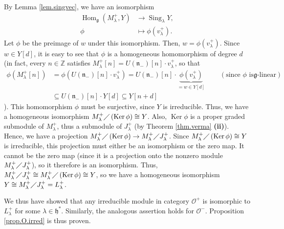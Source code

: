 \documentclass[etingof-lie.tex]{subfiles}
\begin{document}
By Lemma \ref{lem.singvec}, we have an isomorphism%
\begin{align*}
\operatorname*{Hom}\nolimits_{\mathfrak{g}}\left(  M_{\lambda}^{+},Y\right)
&  \rightarrow\operatorname*{Sing}\nolimits_{\lambda}Y,\\
\phi &  \mapsto\phi\left(  v_{\lambda}^{+}\right)  .
\end{align*}
Let $\phi$ be the preimage of $w$ under this isomorphism. Then, $w=\phi\left(
v_{\lambda}^{+}\right)  $. Since $w\in Y\left[  d\right]  $, it is easy to see
that $\phi$ is a homogeneous homomorphism of degree $d$ (in fact, every
$n\in\mathbb{Z}$ satisfies $M_{\lambda}^{+}\left[  n\right]  =U\left(
\mathfrak{n}_{-}\right)  \left[  n\right]  \cdot v_{\lambda}^{+}$, so that%
\begin{align*}
\phi\left(  M_{\lambda}^{+}\left[  n\right]  \right)   &  =\phi\left(
U\left(  \mathfrak{n}_{-}\right)  \left[  n\right]  \cdot v_{\lambda}%
^{+}\right)  =U\left(  \mathfrak{n}_{-}\right)  \left[  n\right]
\cdot\underbrace{\phi\left(  v_{\lambda}^{+}\right)  }_{=w\in Y\left[
d\right]  }\ \ \ \ \ \ \ \ \ \ \left(  \text{since }\phi\text{ is
}\mathfrak{g}\text{-linear}\right) \\
&  \subseteq U\left(  \mathfrak{n}_{-}\right)  \left[  n\right]  \cdot
Y\left[  d\right]  \subseteq Y\left[  n+d\right]
\end{align*}
). This homomorphism $\phi$ must be surjective, since $Y$ is irreducible.
Thus, we have a homogeneous isomorphism $M_{\lambda}^{+}\diagup\left(
\operatorname*{Ker}\phi\right)  \cong Y$. Also, $\operatorname*{Ker}\phi$ is a
proper graded submodule of $M_{\lambda}^{+}$, thus a submodule of $J_{\lambda
}^{+}$ (by Theorem \ref{thm.verma} \textbf{(ii)}). Hence, we have a projection
$M_{\lambda}^{+}\diagup\left(  \operatorname*{Ker}\phi\right)  \rightarrow
M_{\lambda}^{+}\diagup J_{\lambda}^{+}$. Since $M_{\lambda}^{+}\diagup\left(
\operatorname*{Ker}\phi\right)  \cong Y$ is irreducible, this projection must
either be an isomorphism or the zero map. It cannot be the zero map (since it
is a projection onto the nonzero module $M_{\lambda}^{+}\diagup J_{\lambda
}^{+}$), so it therefore is an isomorphism. Thus, $M_{\lambda}^{+}\diagup
J_{\lambda}^{+}\cong M_{\lambda}^{+}\diagup\left(  \operatorname*{Ker}%
\phi\right)  \cong Y$, so we have a homogeneous isomorphism $Y\cong
M_{\lambda}^{+}\diagup J_{\lambda}^{+}=L_{\lambda}^{+}$.

We thus have showed that any irreducible module in category $\mathcal{O}^{+}$
is isomorphic to $L_{\lambda}^{+}$ for some $\lambda\in\mathfrak{h}^{\ast}$.
Similarly, the analogous assertion holds for $\mathcal{O}^{-}$. Proposition
\ref{prop.O.irred} is thus proven.
\end{document}
